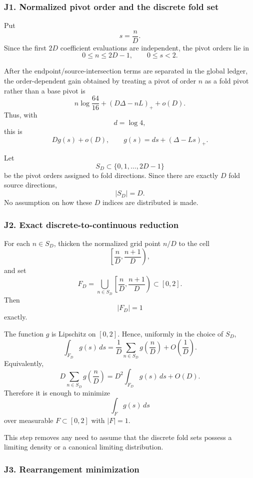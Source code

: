 \documentclass[
  10pt,
  letterpaper,
]{article}
\theoremstyle{definition}
\theoremstyle{remark}
\begin{document}
\subsubsection{J1. Normalized pivot order and the discrete fold
set}\label{j1.-normalized-pivot-order-and-the-discrete-fold-set}

Put \[
s=\frac nD.
\] Since the first \(2D\) coefficient evaluations are independent, the
pivot orders lie in \[
0\le n\le 2D-1,
\qquad
0\le s<2.
\]

After the endpoint/source-intersection terms are separated in the global
ledger, the order-dependent gain obtained by treating a pivot of order
\(n\) as a fold pivot rather than a base pivot is \[
 n\log\frac{64}{16}
 +(D\Delta-nL)_+
 +o(D).
\] Thus, with \[
d=\log4,
\] this is \[
\boxed{
Dg(s)+o(D),
\qquad
g(s)=ds+(\Delta-Ls)_+.
}
\]

Let \[
S_D\subset\{0,1,\dots,2D-1\}
\] be the pivot orders assigned to fold directions. Since there are
exactly \(D\) fold source directions, \[
|S_D|=D.
\] No assumption on how these \(D\) indices are distributed is made.

\subsubsection{J2. Exact discrete-to-continuous
reduction}\label{j2.-exact-discrete-to-continuous-reduction}

For each \(n\in S_D\), thicken the normalized grid point \(n/D\) to the
cell \[
\left[\frac nD,\frac{n+1}{D}\right),
\] and set \[
F_D=
\bigcup_{n\in S_D}
\left[\frac nD,\frac{n+1}{D}\right)
\subset[0,2].
\] Then \[
|F_D|=1
\] exactly.

The function \(g\) is Lipschitz on \([0,2]\). Hence, uniformly in the
choice of \(S_D\), \[
\int_{F_D}g(s)\,ds
=
\frac1D\sum_{n\in S_D}g\!\left(\frac nD\right)
+O\!\left(\frac1D\right).
\] Equivalently, \[
D\sum_{n\in S_D}g\!\left(\frac nD\right)
=
D^2\int_{F_D}g(s)\,ds+O(D).
\] Therefore it is enough to minimize \[
\int_Fg(s)\,ds
\] over measurable \(F\subset[0,2]\) with \(|F|=1\).

This step removes any need to assume that the discrete fold sets possess
a limiting density or a canonical limiting distribution.

\subsubsection{J3. Rearrangement
minimization}\label{j3.-rearrangement-minimization}
\end{document}

